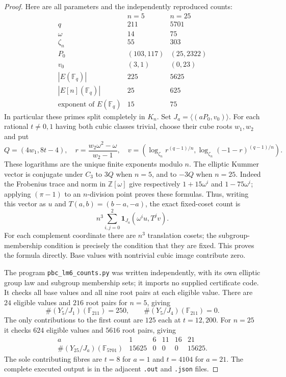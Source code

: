 \begin{proof}
Here are all parameters and the independently reproduced counts:
\[
\begin{array}{c|cc}
 &n=5&n=25\\\hline
 q&211&5701\\
 \omega&14&75\\
 \zeta_n&55&303\\
 P_0&(103,117)&(25,2322)\\
 v_0&(3,1)&(0,23)\\
 |E(\mathbb F_q)|&225&5625\\
 |E[n](\mathbb F_q)|&25&625\\
 \text{exponent of }E(\mathbb F_q)&15&75
\end{array}
\]
In particular these primes split completely in $K_n$.
Set $J_a=\langle(aP_0,v_0)\rangle$. For each rational
$t\ne0,1$ having both cubic classes trivial, choose their cube
roots $w_1,w_2$ and put
\[
 Q=(4w_1,8t-4),\quad
 r=\frac{w_2\omega^2-\omega}{w_2-1},\quad
 v=\left(\log_{\zeta_n}r^{(q-1)/n},
       \log_{\zeta_n}(-1-r)^{(q-1)/n}\right).
\]
These logarithms are the unique finite exponents modulo $n$.
The elliptic Kummer vector is conjugate under $C_3$ to $3Q$
when $n=5$, and to $-3Q$ when $n=25$.
Indeed the Frobenius trace and norm in $\mathbb Z[\omega]$
give respectively $1+15\omega^i$ and $1-75\omega^i$;
applying $(\pi-1)$ to an $n$-division point proves these
formulas. Thus, writing this vector as $u$ and
$T(a,b)=(b-a,-a)$, the exact fixed-coset count is
\[
       n^3\sum_{i,j=0}^{2}
            \mathbf1_{J_a}(\omega^i u,T^jv).
 \tag{B.24.1}
\]
For each complement coordinate there are $n^3$ translation
cosets; the subgroup-membership condition is precisely the
condition that they are fixed. This proves the formula directly.
Base values with nontrivial cubic image contribute zero.

The program \texttt{pbc\_lm6\_counts.py} was written
independently, with its own elliptic group law and subgroup
membership sets; it imports no supplied certificate code.
It checks all base values and all nine root pairs at each
eligible value. There are $24$ eligible values and $216$ root
pairs for $n=5$, giving
\[
 \#(Y_5/J_1)(\mathbb F_{211})=250,
 \qquad\#(Y_5/J_4)(\mathbb F_{211})=0.
\]
The only contributions to the first count are $125$ each at
$t=12,200$. For $n=25$ it checks $624$ eligible values and
$5616$ root pairs, giving
\[
\begin{array}{c|rrrrr}
 a&1&6&11&16&21\\\hline
 \#(Y_{25}/J_a)(\mathbb F_{5701})&15625&0&0&0&15625.
\end{array}
\]
The sole contributing fibres are $t=8$ for $a=1$ and
$t=4104$ for $a=21$. The complete executed output is in the
adjacent \texttt{.out} and \texttt{.json} files.


\end{proof}
